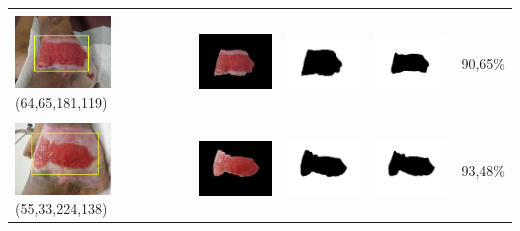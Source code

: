 \begin{table}[H]
\begin{tabular}{|m{1.0in}|m{1.0in}|m{1.0in}|m{1.0in}|m{0.6in}|}
		&  &  & \\
		\includegraphics[width=1.0in]{gambar/hasil_segmentasi/luka_merah/image_12_rect.jpg} {\centering\fontsize{10}{10}\selectfont(64,65,181,119)}&
		\includegraphics[width=1.0in]{gambar/hasil_segmentasi/luka_merah/result_12.jpg}&
		\includegraphics[width=1.0in]{gambar/hasil_segmentasi/luka_merah/mask_r_12.jpg}&
		\includegraphics[width=1.0in]{gambar/hasil_segmentasi/luka_merah/12_r.jpg}&
		90,65\% \\
		\hline

		&  &  & \\
		\includegraphics[width=1.0in]{gambar/hasil_segmentasi/luka_merah/image_14_rect.jpg} {\centering\fontsize{10}{10}\selectfont(55,33,224,138)}&
		\includegraphics[width=1.0in]{gambar/hasil_segmentasi/luka_merah/result_14.jpg}&
		\includegraphics[width=1.0in]{gambar/hasil_segmentasi/luka_merah/mask_r_14.jpg}&
		\includegraphics[width=1.0in]{gambar/hasil_segmentasi/luka_merah/14_r.jpg}&
		93,48\% \\
		\hline

	\end{tabular}
\end{table}
		
